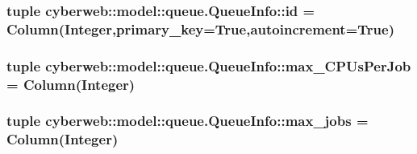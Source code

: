 \hypertarget{classcyberweb_1_1model_1_1queue_1_1_queue_info_a47cd230546b8dfadb55fccf2c122949b}{
\subsubsection[{id}]{\setlength{\rightskip}{0pt plus 5cm}tuple {\bf cyberweb\-::model\-::queue.\-Queue\-Info\-::id} = \-Column(\-Integer,primary\-\_\-key=\-True,autoincrement=\-True)}}\label{classcyberweb_1_1model_1_1queue_1_1_queue_info_a47cd230546b8dfadb55fccf2c122949b}
\hypertarget{classcyberweb_1_1model_1_1queue_1_1_queue_info_a17942945a44563b1164fd8b41b9c3258}{
\subsubsection[{max\-\_\-\-C\-P\-Us\-Per\-Job}]{\setlength{\rightskip}{0pt plus 5cm}tuple {\bf cyberweb\-::model\-::queue.\-Queue\-Info\-::max\-\_\-\-C\-P\-Us\-Per\-Job} = \-Column(\-Integer)}}\label{classcyberweb_1_1model_1_1queue_1_1_queue_info_a17942945a44563b1164fd8b41b9c3258}
\hypertarget{classcyberweb_1_1model_1_1queue_1_1_queue_info_a249ab27d53d954d3040ec38b1f4896b8}{
\subsubsection[{max\-\_\-jobs}]{\setlength{\rightskip}{0pt plus 5cm}tuple {\bf cyberweb\-::model\-::queue.\-Queue\-Info\-::max\-\_\-jobs} = \-Column(\-Integer)}}\label{classcyberweb_1_1model_1_1queue_1_1_queue_info_a249ab27d53d954d3040ec38b1f4896b8}
